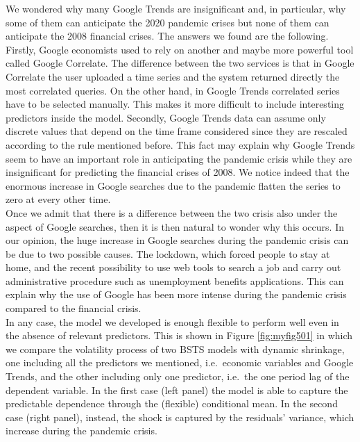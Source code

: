 \documentclass[
  12pt,
]{book}
\theoremstyle{break}
\theoremstyle{nonumberplain}
\begin{document}
We wondered why many Google Trends are insignificant and, in particular,
why some of them can anticipate the 2020 pandemic crises but none of
them can anticipate the 2008 financial crises. The answers we found are
the following. Firstly, Google economists used to rely on another and
maybe more powerful tool called Google Correlate. The difference between
the two services is that in Google Correlate the user uploaded a time
series and the system returned directly the most correlated queries. On
the other hand, in Google Trends correlated series have to be selected
manually. This makes it more difficult to include interesting predictors
inside the model. Secondly, Google Trends data can assume only discrete
values that depend on the time frame considered since they are rescaled
according to the rule mentioned before. This fact may explain why Google
Trends seem to have an important role in anticipating the pandemic
crisis while they are insignificant for predicting the financial crises
of 2008. We notice indeed that the enormous increase in Google searches
due to the pandemic flatten the series to zero at every other time.\\
Once we admit that there is a difference between the two crisis also
under the aspect of Google searches, then it is then natural to wonder
why this occurs. In our opinion, the huge increase in Google searches
during the pandemic crisis can be due to two possible causes. The
lockdown, which forced people to stay at home, and the recent
possibility to use web tools to search a job and carry out
administrative procedure such as unemployment benefits applications.
This can explain why the use of Google has been more intense during the
pandemic crisis compared to the financial crisis.\\
In any case, the model we developed is enough flexible to perform well
even in the absence of relevant predictors. This is shown in Figure
\ref{fig:myfig501} in which we compare the volatility process of two
BSTS models with dynamic shrinkage, one including all the predictors we
mentioned, i.e.~economic variables and Google Trends, and the other
including only one predictor, i.e.~the one period lag of the dependent
variable. In the first case (left panel) the model is able to capture
the predictable dependence through the (flexible) conditional mean. In
the second case (right panel), instead, the shock is captured by the
residuals' variance, which increase during the pandemic crisis.
\end{document}
